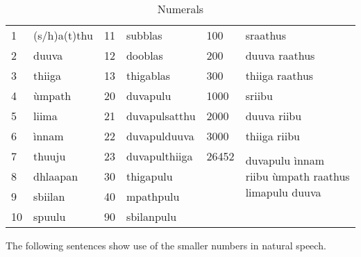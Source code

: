 \begin{table}
	\centering
		  \begin{tabular}{ll|ll|ll}
  			1 & (s/h)a(t)thu 	& 11 & subblas   & 100 		& sraathus \\
  			2 & duuva	& 12 & dooblas   &  200 	& duuva raathus \\
  			3 & thiiga	& 13 & thigablas &   300 	& thiiga raathus \\
  			4 & ùmpath	& 20 & duvapulu	 &  1000	& sriibu\\
  			5 & liima	& 21 & duvapulsatthu&  2000	& duuva riibu \\
  			6 & ìnnam	& 22 & duvapulduuva &   3000	& thiiga riibu\\
  			7 & thuuju	& 23 & duvapulthiiga & 26452	& \multirow{3}{4cm}{duvapulu ìnnam riibu ùmpath raathus limapulu duuva} \\
  			8 & dhlaapan	& 30 & thigapulu	&  \\
  			9 & sbiilan	& 40 & mpathpulu	&  \\
  			10 & spuulu	& 90 & sbilanpulu	&  \\
  		\end{tabular}
 			\caption{Numerals}
  		\label{tab:Numerals}
\end{table}




The following sentences show use of the smaller numbers in natural speech.

%


% 


